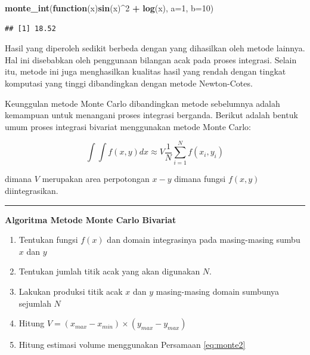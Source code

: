 \documentclass[]{book}
\newenvironment{Shaded}{\begin{snugshade}}{\end{snugshade}}
\newcommand{\ControlFlowTok}[1]{\textcolor[rgb]{0.13,0.29,0.53}{\textbf{#1}}}
\newcommand{\DataTypeTok}[1]{\textcolor[rgb]{0.13,0.29,0.53}{#1}}
\newcommand{\DecValTok}[1]{\textcolor[rgb]{0.00,0.00,0.81}{#1}}
\newcommand{\KeywordTok}[1]{\textcolor[rgb]{0.13,0.29,0.53}{\textbf{#1}}}
\newcommand{\NormalTok}[1]{#1}
\newcommand{\OperatorTok}[1]{\textcolor[rgb]{0.81,0.36,0.00}{\textbf{#1}}}
\newcommand{\StringTok}[1]{\textcolor[rgb]{0.31,0.60,0.02}{#1}}
\providecommand{\tightlist}{%
  \setlength{\itemsep}{0pt}\setlength{\parskip}{0pt}}
\theoremstyle{definition}
\theoremstyle{definition}
\theoremstyle{definition}
\theoremstyle{remark}
\begin{document}
\begin{Shaded}
\begin{Highlighting}[]
\KeywordTok{monte_int}\NormalTok{(}\ControlFlowTok{function}\NormalTok{(x)}\KeywordTok{sin}\NormalTok{(x)}\OperatorTok{^}\DecValTok{2} \OperatorTok{+}\StringTok{ }\KeywordTok{log}\NormalTok{(x), }\DataTypeTok{a=}\DecValTok{1}\NormalTok{, }\DataTypeTok{b=}\DecValTok{10}\NormalTok{)}
\end{Highlighting}
\end{Shaded}

\begin{verbatim}
## [1] 18.52
\end{verbatim}

Hasil yang diperoleh sedikit berbeda dengan yang dihasilkan oleh metode lainnya. Hal ini disebabkan oleh penggunaan bilangan acak pada proses integrasi. Selain itu, metode ini juga menghasilkan kualitas hasil yang rendah dengan tingkat komputasi yang tinggi dibandingkan dengan metode Newton-Cotes.

Keunggulan metode Monte Carlo dibandingkan metode sebelumnya adalah kemampuan untuk menangani proses integrasi berganda. Berikut adalah bentuk umum proses integrasi bivariat menggunakan metode Monte Carlo:

\begin{equation}
\int \int f\left(x,y\right)dx\approx V\frac{1}{N}\sum_{i=1}^Nf\left(x_i,y_i\right)
  \label{eq:monte2}
\end{equation}

dimana \(V\) merupakan area perpotongan \(x-y\) dimana fungsi \(f\left(x,y\right)\) diintegrasikan.

\begin{center}\rule{0.5\linewidth}{\linethickness}\end{center}

\textbf{Algoritma Metode Monte Carlo Bivariat}

\begin{enumerate}
\def\labelenumi{\arabic{enumi}.}
\tightlist
\item
  Tentukan fungsi \(f\left(x\right)\) dan domain integrasinya pada masing-masing sumbu \(x\) dan \(y\)
\item
  Tentukan jumlah titik acak yang akan digunakan \(N\).
\item
  Lakukan produksi titik acak \(x\) dan \(y\) masing-masing domain sumbunya sejumlah \(N\)
\item
  Hitung \(V=\left( x_{max}-x_{min}\right) \times \left(y_{max}-y_{max}\right)\)
\item
  Hitung estimasi volume menggunakan Persamaan \eqref{eq:monte2}
\end{enumerate}
\end{document}
